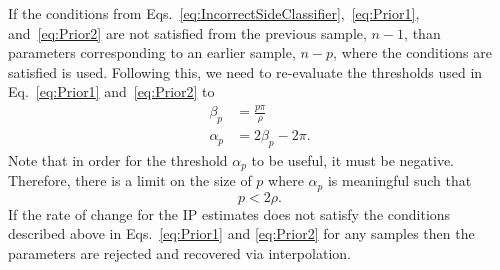 \documentclass[a4paper]{IEEEtran}
\begin{document}
If the conditions from Eqs.~\ref{eq:IncorrectSideClassifier},~\ref{eq:Prior1}, and~\ref{eq:Prior2} are not satisfied from the previous sample, $n-1$, than parameters corresponding to an earlier sample, $n-p$, where the conditions are satisfied is used. Following this, we need to re-evaluate the thresholds used in Eq.~\ref{eq:Prior1} and~\ref{eq:Prior2} to
\begin{align}
	\beta_p &= \frac{p\pi}{\rho} \\
	\alpha_p &=2\beta_p-2\pi.
\end{align}
Note that in order for the threshold $\alpha_p$ to be useful, it must be negative. Therefore, there is a limit on the size of $p$ where $\alpha_p$ is meaningful such that
\begin{equation}
	p < 2\rho.
\end{equation}
If the rate of change for the IP estimates does not satisfy the conditions described above in Eqs.~\ref{eq:Prior1} and \ref{eq:Prior2} for any samples then the parameters are rejected and recovered via interpolation.
\end{document}
